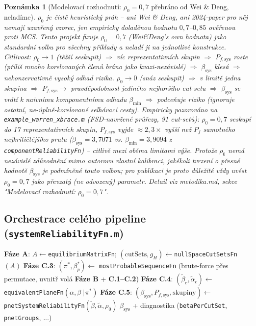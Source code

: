 \documentclass[11pt,a4paper]{article}
\newtheorem{remark}{Poznámka}
\newcommand{\code}[1]{\texttt{#1}}
\begin{document}
\begin{remark}[Modelovací rozhodnutí: $\rho_0=0{,}7$ přebráno od Wei \& Deng, neladíme]
\label{rem:rho0}
$\rho_0$ je čistě heuristický práh -- ani Wei \& Deng, ani 2024-paper pro něj nemají uzavřený
vzorec, jen empiricky doladěnou hodnotu $0{,}7$--$0{,}85$ ověřenou proti MCS. Tento projekt fixuje
$\rho_0=0{,}7$ (Wei\&Deng's own hodnota) jako standardní volbu pro všechny příklady a neladí ji na
jednotlivé konstrukce. Citlivost: $\rho_0\to1$ (těžší seskupit) $\Rightarrow$ víc reprezentativních
skupin $\Rightarrow$ $P_{f,\mathrm{sys}}$ roste (příliš mnoho korelovaných členů bráno jako
kvazi-nezávislé) $\Rightarrow$ $\beta_{\mathrm{sys}}$ klesá $\Rightarrow$ nekonzervativně vysoký
odhad rizika. $\rho_0\to0$ (snáz seskupit) $\Rightarrow$ v limitě jedna skupina $\Rightarrow$
$P_{f,\mathrm{sys}}\to$ pravděpodobnost jediného nejhoršího cut-setu $\Rightarrow$
$\beta_{\mathrm{sys}}$ se vrátí k naivnímu komponentnímu odhadu $\beta_{\min}$ $\Rightarrow$
podceňuje riziko (ignoruje ostatní, ne-úplně-korelované selhávací cesty). Empiricky pozorováno na
\code{example\_warren\_xbrace.m} (FSD-navržené průřezy, 91 cut-setů): $\rho_0=0{,}7$ seskupí do 17
reprezentativních skupin, $P_{f,\mathrm{sys}}$ vyjde $\approx\!2{,}3\times$ vyšší než $P_f$
samotného nejkritičtějšího prutu ($\beta_{\mathrm{sys}}=3{,}7071$ vs.
$\beta_{\min}=3{,}9094$ z \code{componentReliabilityFn}) -- citlivě mezi oběma limitami výše.
Protože $\rho_0$ nemá nezávislé zdůvodnění mimo autorovu vlastní kalibraci, jakékoli tvrzení o
přesné hodnotě $\beta_{\mathrm{sys}}$ je podmíněné touto volbou; pro publikaci je proto důležité
vždy uvést $\rho_0=0{,}7$ jako převzatý (ne odvozený) parametr. Detail viz metodika.md, sekce
"Modelovací rozhodnutí: $\rho_0=0{,}7$".
\end{remark}

\subsection{Orchestrace celého pipeline (\code{systemReliabilityFn.m})}

\begin{algorithm}[h]
\caption{Systémová spolehlivost staticky neurčité příhrady -- celý postup A--C}
\begin{algorithmic}[1]
\State \textbf{Fáze A}: $A\gets$\code{equilibriumMatrixFn}; $(\text{cutSets}, g_H)\gets$\code{nullSpaceCutSetsFn}$(A)$
    \State \textbf{Fáze C.3}: $(\pi^\ast,\beta_p^\ast) \gets$ \code{mostProbableSequenceFn} (brute-force přes permutace, uvnitř volá \textbf{Fáze B} + \textbf{C.1--C.2})
    \State \textbf{Fáze C.4}: $(\tilde\beta_c,\tilde\alpha_c)\gets$\code{equivalentPlaneFn}$(\alpha,\beta\,|\,\pi^\ast)$
\EndFor
\State \textbf{Fáze C.5}: $(\beta_{\mathrm{sys}}, P_{f,\mathrm{sys}}, \text{skupiny})\gets$\code{pnetSystemReliabilityFn}$(\tilde\beta,\tilde\alpha,\rho_0)$
\State \Return $\beta_{\mathrm{sys}}$ + diagnostika (\code{betaPerCutSet}, \code{pnetGroups}, ...)
\end{algorithmic}
\end{algorithm}
\end{document}
